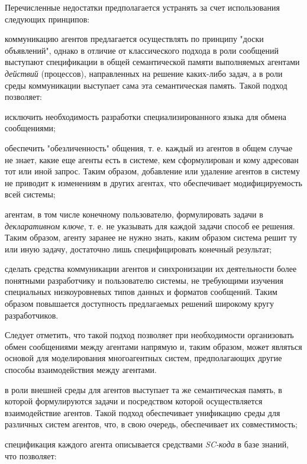 Перечисленные недостатки предполагается устранять за счет использования следующих принципов:
\begin{textitemize}
\item коммуникацию агентов предлагается осуществлять по принципу "доски объявлений"{}, однако в отличие от классического подхода в роли сообщений выступают спецификации в общей семантической памяти выполняемых агентами \textit{действий} (процессов), направленных на решение каких-либо задач, а в роли среды коммуникации выступает сама эта семантическая память. Такой подход позволяет: 
	\begin{textitemize}
	\item исключить необходимость разработки специализированного языка для обмена сообщениями;
	\item обеспечить "обезличенность"{} общения, т. е. каждый из агентов в общем случае не знает, какие еще агенты есть в системе, кем сформулирован и кому адресован тот или иной запрос. Таким образом, добавление или удаление агентов в систему не приводит к изменениям в других агентах, что обеспечивает модифицируемость всей системы;
	\item агентам, в том числе конечному пользователю, формулировать задачи в \textit{декларативном ключе}, т. е. не указывать для каждой задачи способ ее решения. Таким образом, агенту заранее не нужно знать, каким образом система решит ту или иную задачу, достаточно лишь специфицировать конечный результат;
	\item сделать средства коммуникации агентов и синхронизации их деятельности более понятными разработчику и пользователю системы, не требующими изучения специальных низкоуровневых типов данных и форматов сообщений. Таким образом повышается доступность предлагаемых решений широкому кругу разработчиков.
	\end{textitemize}
Следует отметить, что такой подход позволяет при необходимости организовать обмен сообщениями между агентами напрямую и, таким образом, может являться основой для моделирования многоагентных систем, предполагающих другие способы взаимодействия между агентами.
\item в роли внешней среды для агентов выступает та же семантическая память, в которой формулируются задачи и посредством которой осуществляется взаимодействие агентов. Такой подход обеспечивает унификацию среды для различных систем агентов, что, в свою очередь, обеспечивает их совместимость;
\item спецификация каждого агента описывается средствами \textit{SC-кода} в базе знаний, что позволяет:

\end{textitemize}
